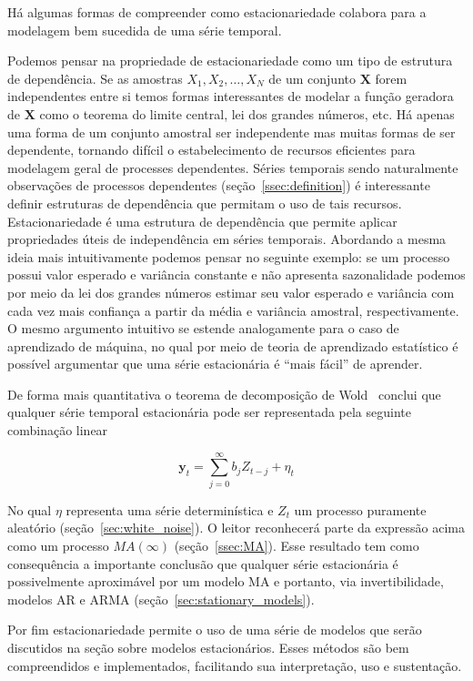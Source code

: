 Há algumas formas de compreender como estacionariedade colabora para a
modelagem bem sucedida de uma série temporal.

Podemos pensar na propriedade de estacionariedade como um tipo de estrutura de
dependência. Se as amostras $X_1, X_2, \dots, X_N$ de um conjunto $\mathbf{X}$
forem independentes entre si temos formas interessantes de modelar a função
geradora de $\mathbf{X}$ como o teorema do limite central, lei dos grandes
números, etc. Há apenas uma forma de um conjunto amostral ser independente mas
muitas formas de ser dependente, tornando difícil o estabelecimento de recursos
eficientes para modelagem geral de processes dependentes. Séries temporais
sendo naturalmente observações de processos dependentes
(seção~\ref{ssec:definition}) é interessante definir estruturas de dependência
que permitam o uso de tais recursos. Estacionariedade é uma estrutura de
dependência que permite aplicar propriedades úteis de independência em séries
temporais. Abordando a mesma ideia mais intuitivamente podemos pensar no
seguinte exemplo: se um processo possui valor esperado e variância constante e
não apresenta sazonalidade podemos por meio da lei dos grandes números estimar
seu valor esperado e variância com cada vez mais confiança a partir da média e
variância amostral, respectivamente. O mesmo argumento intuitivo se estende
analogamente para o caso de aprendizado de máquina, no qual por meio de teoria
de aprendizado estatístico é possível argumentar que uma série estacionária é
``mais fácil'' de aprender.

De forma mais quantitativa o teorema de decomposição de Wold~\cite{chatfield}
conclui que qualquer série temporal estacionária pode ser representada pela
seguinte combinação linear

$$\mathbf{y}_t = \sum_{j=0}^\infty b_j Z_{t-j} + \eta_t$$

No qual $\eta$ representa uma série determinística e $Z_t$ um processo
puramente aleatório (seção~\ref{sec:white_noise}). O leitor reconhecerá parte da expressão
acima como um processo $MA(\infty)$ (seção~\ref{ssec:MA}). Esse resultado tem
como consequência a importante conclusão que qualquer série estacionária é
possivelmente aproximável por um modelo MA e portanto, via invertibilidade,
modelos AR e ARMA (seção~\ref{sec:stationary_models}).

Por fim estacionariedade permite o uso de uma série de modelos que serão
discutidos na seção sobre modelos estacionários. Esses métodos são bem
compreendidos e implementados, facilitando sua interpretação, uso e
sustentação.

